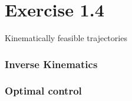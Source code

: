 \section*{Exercise 1.4}
Kinematically feasible trajectories

\subsubsection*{Inverse Kinematics}

\subsubsection*{Optimal control}
